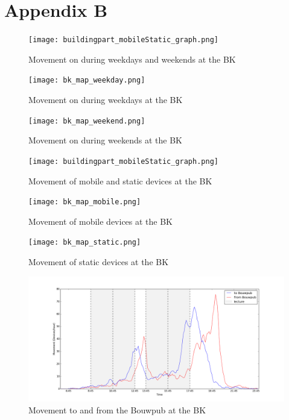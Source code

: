 \chapter{Appendix B}\label{appendixB}

\begin{figure}[H]
\centering
\texttt{[image: buildingpart\_mobileStatic\_graph.png]}
\captionsetup{justification=centering}
\caption{Movement on during weekdays and weekends at the BK}
\label{figure:bk_weekdayWeekend}
\end{figure}

\begin{figure}[H]
\centering
\texttt{[image: bk\_map\_weekday.png]}
\captionsetup{justification=centering}
\caption{Movement on during weekdays at the BK}
\label{map:bk_weekday}
\end{figure}

\begin{figure}[H]
\centering
\texttt{[image: bk\_map\_weekend.png]}
\captionsetup{justification=centering}
\caption{Movement on during weekends at the BK}
\label{map:bk_weekend}
\end{figure}

\begin{figure}[H]
\centering
\texttt{[image: buildingpart\_mobileStatic\_graph.png]}
\captionsetup{justification=centering}
\caption{Movement of mobile and static devices at the BK}
\label{figure:bk_MobileStatic}
\end{figure}

\begin{figure}[H]
\centering
\texttt{[image: bk\_map\_mobile.png]}
\captionsetup{justification=centering}
\caption{Movement of mobile devices at the BK}
\label{map:bk_mobile}
\end{figure}

\begin{figure}[H]
\centering
\texttt{[image: bk\_map\_static.png]}
\captionsetup{justification=centering}
\caption{Movement of static devices at the BK}
\label{map:bk_static}
\end{figure}

\begin{figure}[H]
\centering
\includegraphics[scale=0.8]{buildingpart_fromTo_bouwpubGraph.png}
\captionsetup{justification=centering}
\caption{Movement to and from the Bouwpub at the BK}
\label{figure:bk_Bouwpub}
\end{figure}


